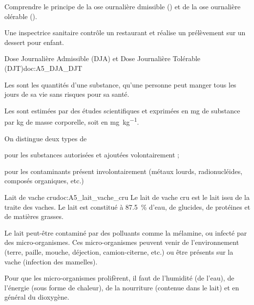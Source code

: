\teteTermStssAlim
{}


\begin{objectifs}
  \item Comprendre le principe de la ose ournalière dmissible ()
  et de la ose ournalière olérable ().
\end{objectifs}

\begin{contexte}
  Une inspectrice sanitaire contrôle un restaurant et réalise un prélèvement sur un dessert pour enfant.

\end{contexte}


\begin{doc}{Dose Journalière Admissible (DJA) et Dose Journalière Tolérable (DJT)}{doc:A5_DJA_DJT}
  \begin{importants}
    Les  sont les quantités d'une substance, qu'une personne peut manger tous les jours de sa vie sans risques pour sa santé.
  \end{importants}  

  Les  sont estimées par des études scientifiques et exprimées en \unit{\mg} de substance par \unit{\kg} de masse corporelle, soit en \unit{\mg\per\kg}.

  \begin{importants}
    On distingue deux types de 
    \begin{listePoints}  
      \item {} pour les substances autorisées et ajoutées volontairement ;
      \item {} pour les contaminants présent involontairement (métaux lourds, radionucléides, composés organiques, etc.)
    \end{listePoints}
  \end{importants}
\end{doc}

\begin{doc}{Lait de vache cru}{doc:A5_lait_vache_cru}
  Le lait de vache cru est le lait issu de la traite des vaches.
  Le lait est constitué à \qty{87,5}{\percent} d'eau, de glucides, de protéines et de matières grasses.

  Le lait peut-être contaminé par des polluants comme la mélamine, ou infecté par des micro-organismes.
  Ces micro-organismes peuvent venir de l'environnement (terre, paille, mouche, déjection, camion-citerne, etc.) ou être présents sur la vache (infection des mamelles).

  Pour que les micro-organismes prolifèrent, il faut de l'humidité (de l'eau), de l'énergie (sous forme de chaleur), de la nourriture (contenue dans le lait) et en général du dioxygène.
\end{doc}

